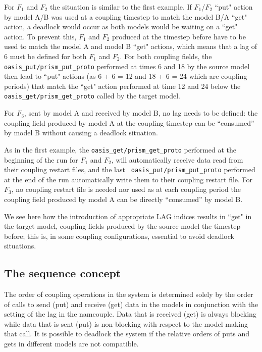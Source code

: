 \begin{enumerate}
  For $F_1$ and $F_2$ the situation is similar to the first
  example. If $F_1$/$F_2$ ``put" action by model A/B was used at a
  coupling timestep to match the model B/A ``get" action, a
  deadlock would occur as both models would be waiting on a ``get"
  action. To prevent this, $F_1$ and $F_2$ produced at the timestep
  before have to be used to match the model A and model B ``get"
  actions, which means that a lag of 6 must be defined for both $F_1$
  and $F_2$. For both coupling fields, the {\tt oasis\_put/prism\_put\_proto}
  performed at times 6 and 18 by the source model then lead to ``put"
  actions (as 6 + 6 = 12 and 18 + 6 = 24 which are coupling periods)
  that match the ``get" action performed at time 12 and 24 below
  the {\tt oasis\_get/prism\_get\_proto} called by the target model.

  For $F_3$, sent by model A and received by model B, no lag
  needs to be defined: the coupling field produced by model A at the
  coupling timestep can be ``consumed'' by model B without causing a
  deadlock situation.

  As in the first example, the {\tt oasis\_get/prism\_get\_proto} performed at
  the beginning of the run for $F_1$ and $F_2$, will automatically receive data read from their coupling restart files, and the last {\tt
  oasis\_put/prism\_put\_proto} performed at the end of the run automatically
  write them to their coupling restart file. For $F_3$, no coupling
  restart file is needed nor used as at each coupling period the
  coupling field produced by model A can be directly ``consumed'' by
  model B.

  We see here how the introduction of appropriate LAG indices results in
  ``get" in the target model,
  coupling fields produced by the
  source model the timestep before; this is, in some coupling
  configurations, essential to avoid deadlock situations.

  \end{enumerate}

\subsection{The sequence concept}

The order of coupling operations in the system is determined solely
by the order of calls to send (put) and receive (get) data in the models
in conjunction with the setting of the lag in the namcouple.  Data that is
received (get) is always blocking while data that is sent (put) is non-blocking
with respect to the model making that call.  It is possible
to deadlock the system if the relative orders of puts and gets in different
models are not compatible. 

